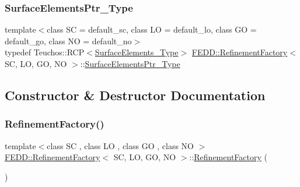 \subsubsection{\texorpdfstring{Surface\+Elements\+Ptr\+\_\+\+Type}{SurfaceElementsPtr\_Type}}
{\footnotesize\ttfamily template$<$class SC  = default\+\_\+sc, class LO  = default\+\_\+lo, class GO  = default\+\_\+go, class NO  = default\+\_\+no$>$ \\
typedef Teuchos\+::\+R\+CP$<$\hyperlink{classFEDD_1_1RefinementFactory_ac050bc27156fc5a1e8bf0e01381c33c4}{Surface\+Elements\+\_\+\+Type}$>$ \hyperlink{classFEDD_1_1RefinementFactory}{F\+E\+D\+D\+::\+Refinement\+Factory}$<$ SC, LO, GO, NO $>$\+::\hyperlink{classFEDD_1_1RefinementFactory_a1067ba23325b19eae16a864f25f7d68f}{Surface\+Elements\+Ptr\+\_\+\+Type}}



\subsection{Constructor \& Destructor Documentation}
\mbox{\label{classFEDD_1_1RefinementFactory_a45a83da1b5be5f4bcb091cf56caca25e}} 
\subsubsection{\texorpdfstring{Refinement\+Factory()}{RefinementFactory()}\hspace{0.1cm}{\footnotesize\ttfamily [1/3]}}
{\footnotesize\ttfamily template$<$class SC , class LO , class GO , class NO $>$ \\
\hyperlink{classFEDD_1_1RefinementFactory}{F\+E\+D\+D\+::\+Refinement\+Factory}$<$ SC, LO, GO, NO $>$\+::\hyperlink{classFEDD_1_1RefinementFactory}{Refinement\+Factory} (\begin{DoxyParamCaption}{ }\end{DoxyParamCaption})}

\mbox{\label{classFEDD_1_1RefinementFactory_a0815e8208b193e64c26e64d94691a967}} 
